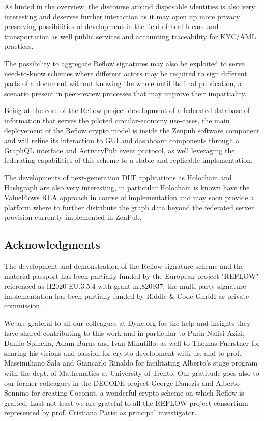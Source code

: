 \documentclass[twocolumn]{article}
\begin{document}
As hinted in the overview, the discourse around disposable identities
is also very interesting and deserves further interaction as it may
open up more privacy preserving possibilities of development in the
field of health-care and transportation as well public services and
accounting traceability for KYC/AML practices.

The possibility to aggregate Reflow signatures may also be exploited
to serve need-to-know schemes where different actors may be required
to sign different parts of a document without knowing the whole until
its final publication, a scenario present in peer-review processes
that may improve their impartiality.

Being at the core of the Reflow project development of a federated
database of information that serves the piloted circular-economy
use-cases, the main deployement of the Reflow crypto model is inside the
Zenpub software component and will refine its interaction to GUI and
dashboard components through a GraphQL interface and ActivityPub event
protocol, as well leveraging the federating capabilities of this scheme
to a stable and replicable implementation.

The developments of next-generation DLT applications as Holochain
\citep{holochain} and Hashgraph \citep{hashgraph} are also very
interesting, in particular Holochain is known have the ValueFlows REA
approach in course of implementation and may soon provide a platform
where to further distribute the graph data beyond the federated server
provision currently implemented in ZenPub.

\subsection{Acknowledgments}

The development and demonstration of the Reflow signature scheme and the
material passport has been partially funded by the European project
"REFLOW" referenced as H2020-EU.3.5.4 with grant nr.820937; the
multi-party signature implementation has been partially funded by Riddle
\& Code GmbH as private commission.

We are grateful to all our colleagues at Dyne.org for the help and
insights they have shared contributing to this work and in particular to
Puria Nafisi Azizi, Danilo Spinella, Adam Burns and Ivan Minutillo; as
well to Thomas Fuerstner for sharing his visions and passion for crypto
development with us; and to prof. Massimiliano Sala and Giancarlo
Rinaldo for facilitating Alberto's stage program with the dept. of
Mathematics at University of Trento. Our gratitude goes also to our
former colleagues in the DECODE project George Danezis and Alberto
Sonnino for creating Coconut, a wonderful crypto scheme on which Reflow
is grafted. Last not least we are grateful to all the REFLOW project
consortium represented by prof. Cristiana Parisi as principal
investigator.





\listoffigures
\end{document}
